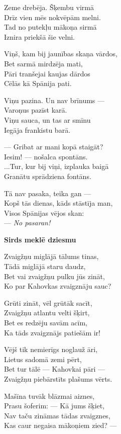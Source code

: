 \documentclass[11pt]{article}
\begin{document}
Zeme drebēja. Šķembu virmā\\
Drīz vien mēs nokvēpām melni.\\
Tad no putekļu mākoņa sirmā\\
Iznira priekšā šie velni.

Viņš, kam bij jaunības skaņa vārdos,\\
Bet sarmā mirdzēja mati,\\
Pāri tranšejai kaujas dārdos\\
Cēlās kā Spānija pati.

Viņu pazina. Un nav brīnums ---\\
Varoņus pazīst karā.\\
Viņu sauca, un tas ar smīnu\\
Iegāja frankistu barā.

--- Gribat ar mani kopā staigāt?\\
Iesim! --- nošalca spontāns.\\
...Tur, kur bij viņi, izplauka baigā\\
Granātu sprādziena fontāns.

Tā nav pasaka, teika gan ---\\
Kopš tās dienas, kāds stāstīja man,\\
Visos Spānijas vējos skan:\\
--- {\em No pasaran!}

\newpage

{\bf Sirds meklē dziesmu}

Zvaigžņu miglājā tālums tinas,\\
Tādā miglājā staru daudz,\\
Bet vai zvaigžņu pulku jūs zināt,\\
Ko par Kahovkas zvaigznāju sauc?

Grūti zināt, vēl grūtāk sacīt,\\
Zvaigžņu atlantu velti šķirt,\\
Bet es redzēju savām acīm,\\
Ka tāds zvaigznājs patiešām ir!

Vējš tik nemierīgs noglauž āri,\\
Lietus sadomā zemi pērt,\\
Bet tur tālē --- Kahovkai pāri ---\\
Zvaigžņu piebārstīts plašums vērts.

Mašīna tuvāk blāzmai aiznes,\\
Prasu šoferim: --- Kā jums šķiet, \\
Nav taču zināmas tādas zvaigznes,\\
Kas caur negaisa mākoņiem zied? ---
\end{document}
